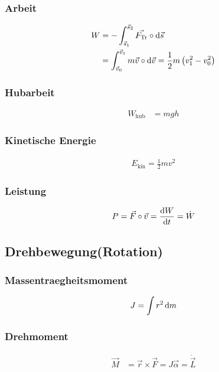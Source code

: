 \begin{multicols}{2}{}
\subsubsection*{Arbeit}
\begin{align*}
W&=-\int_{\vec{s}_1}^{\vec{s}_2}\vec{F_{\text{Tr}}}\circ\mathop{}\!\mathrm{d} \vec{s}\\
&=\int_{\vec{v}_0}^{\vec{v}_1}m\vec{v}\circ\mathop{}\!\mathrm{d} \vec{v}=\frac{1}{2}m\left(v_1^2-v_0^2\right) 
\end{align*}

\subsubsection*{Hubarbeit}
\begin{align*}
W_{\text{hub}}&=mgh
\end{align*}
\end{multicols}

\begin{multicols}{2}{}
\subsubsection*{Kinetische Energie}
\begin{align*}
E_{\text{kin}}=\frac{1}{2}mv^2
\end{align*}

\subsubsection*{Leistung}
\begin{align*}
P=\vec{F}\circ\vec{v}=\frac{\mathop{}\!\mathrm{d} W}{\mathop{}\!\mathrm{d} t}=\dot{W}
\end{align*}
\end{multicols}


\subsection{Drehbewegung(Rotation)}

\begin{multicols}{2}{}
\subsubsection*{Massentraegheitsmoment}
\begin{align*}
J=\int r^2 \mathop{}\!\mathrm{d} m
\end{align*}

\subsubsection*{Drehmoment}
\begin{align*}
\vec{M}&=\vec{r}\times\vec{F}=J\vec{\alpha}=\dot{\vec{L}}
\end{align*}
\end{multicols}

